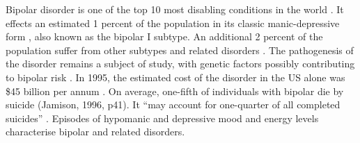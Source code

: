 Bipolar disorder is one of the top 10 most disabling conditions in the world \citep{kupfer_increasing_2005}. It effects an estimated 1 percent of the population in its classic manic-depressive form \citep{weissman_cross-national_1996}, also known as the bipolar I subtype. An additional 2 percent of the population suffer from other subtypes and related disorders \citep{kupfer_increasing_2005}. The pathogenesis of the disorder remains a subject of study, with genetic factors possibly contributing to bipolar risk \citep{fears_multisystem_2014}. In 1995, the estimated cost of the disorder in the US alone was \$45 billion per annum \citep{wyatt_economic_1995}. On average, one-fifth of individuals with bipolar die by suicide \cite{jamison_touched_1996} (Jamison, 1996, p41). It “may account for one-quarter of all completed suicides” \citep[Diagnostic and Statistical Manual of Mental Disorders][p131]{_diagnostic_2013}. Episodes of hypomanic and depressive mood and energy levels characterise bipolar and related disorders.